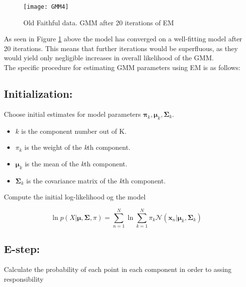 \begin{figure}[H]
\centering
\texttt{[image: GMM4]}
\caption{Old Faithful data. GMM after 20 iterations of EM}
\label{fig:GMM4}
\end{figure}

As seen in Figure \ref{fig:GMM4} above the model has converged on a well-fitting model after 20 iterations.
This means that further iterations would be superfluous, as they would yield only negligible increases in overall likelihood of the GMM. \\

The specific procedure for estimating GMM parameters using EM is as follows: %

\subsection*{Initialization:}

Choose initial estimates for model parameters $ \mathbf{\pi}_{k}, \mathbf{\mu}_{k}, \mathbf{\Sigma}_{k} $.

\begin{itemize}

\item
$ k $ is the component number out of K.

\item
$ \pi_{k} $  is the weight of the \textit{k}th component.

\item
$ \mathbf{\mu}_{k}$ is the mean of the \textit{k}th component.

\item
$ \mathbf{\Sigma}_{k} $ is the covariance matrix of the \textit{k}th component.

\end{itemize}


Compute the initial log-likelihood og the model

\begin{equation} \label{eq:loglikeGMM}
\ln p\left(X | \mathbf{\mu}, \mathbf{\Sigma}, \pi\right) = 
\sum_{n=1}^{N} \ln \sum_{k=1}^{N} \pi_{k}\mathcal{N}(\mathbf{x}_{n}|\mathbf{\mu}_{k},\mathbf{\Sigma}_{k})
\end{equation}

\subsection*{E-step:}
Calculate the probability of each point in each component in order to assing responsibility

